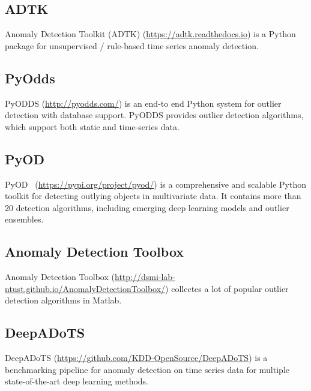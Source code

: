 \subsection{ADTK}

Anomaly Detection Toolkit (ADTK) (\href{https://adtk.readthedocs.io}{https://adtk.readthedocs.io}) is a Python package for
unsupervised / rule-based time series anomaly detection.

\subsection{PyOdds}

PyODDS (\href{http://pyodds.com/}{http://pyodds.com/}) is an end-to end Python system for
outlier detection with database support.
PyODDS provides outlier detection algorithms,
which support both static and time-series data.

\subsection{PyOD}

PyOD~\cite{zhao2019pyod} (\href{https://pypi.org/project/pyod/}{https://pypi.org/project/pyod/})
is a comprehensive and scalable Python toolkit for
detecting outlying objects in multivariate data.
It contains more than 20 detection algorithms,
including emerging deep learning models and
outlier ensembles.

\subsection{Anomaly Detection Toolbox}

Anomaly Detection Toolbox
(\href{http://dsmi-lab-ntust.github.io/AnomalyDetectionToolbox/}{http://dsmi-lab-ntust.github.io/AnomalyDetectionToolbox/})
collectes a lot of popular outlier detection algorithms in Matlab.

\subsection{DeepADoTS}

DeepADoTS (\href{https://github.com/KDD-OpenSource/DeepADoTS}{https://github.com/KDD-OpenSource/DeepADoTS})
is a benchmarking pipeline for anomaly detection on
time series data for
multiple state-of-the-art deep learning methods.


